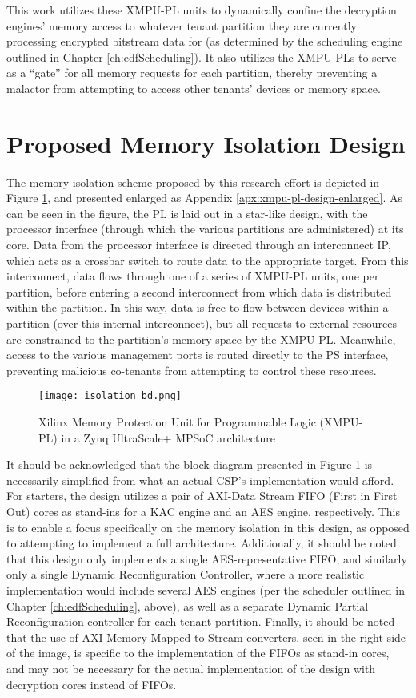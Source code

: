 This work utilizes these XMPU-PL units to dynamically confine the decryption engines' memory access to whatever tenant partition they are currently processing encrypted bitstream data for (as determined by the scheduling engine outlined in Chapter \ref{ch:edfScheduling}). It also utilizes the XMPU-PLs to serve as a ``gate'' for all memory requests for each partition, thereby preventing a malactor from attempting to access other tenants' devices or memory space.

\section{Proposed Memory Isolation Design}\label{sec:DMADesign}

The memory isolation scheme proposed by this research effort is depicted in Figure \ref{fig:XMPU-PLDesign}, and presented enlarged as Appendix \ref{apx:xmpu-pl-design-enlarged}. As can be seen in the figure, the PL is laid out in a star-like design, with the processor interface (through which the various partitions are administered) at its core. Data from the processor interface is directed through an interconnect IP, which acts as a crossbar switch to route data to the appropriate target. From this interconnect, data flows through one of a series of XMPU-PL units, one per partition, before entering a second interconnect from which data is distributed within the partition. In this way, data is free to flow between devices within a partition (over this internal interconnect), but all requests to external resources are constrained to the partition's memory space by the XMPU-PL. Meanwhile, access to the various management ports is routed directly to the PS interface, preventing malicious co-tenants from attempting to control these resources.
\begin{figure}[ht]
    \centering
    \texttt{[image: isolation\_bd.png]}
    \caption [Proposed XMPU-PL Design]{Xilinx Memory Protection Unit for Programmable Logic (XMPU-PL) in a Zynq UltraScale+ MPSoC architecture}
    \label{fig:XMPU-PLDesign}
\end{figure}

It should be acknowledged that the block diagram presented in Figure \ref{fig:XMPU-PLDesign} is necessarily simplified from what an actual CSP's implementation would afford. For starters, the design utilizes a pair of AXI-Data Stream FIFO (First in First Out) cores as stand-ins for a KAC engine and an AES engine, respectively. This is to enable a focus specifically on the memory isolation in this design, as opposed to attempting to implement a full architecture. Additionally, it should be noted that this design only implements a single AES-representative FIFO, and similarly only a single Dynamic Reconfiguration Controller, where a more realistic implementation would include several AES engines (per the scheduler outlined in Chapter \ref{ch:edfScheduling}, above), as well as a separate Dynamic Partial Reconfiguration controller for each tenant partition. Finally, it should be noted that the use of AXI-Memory Mapped to Stream converters, seen in the right side of the image, is specific to the implementation of the FIFOs as stand-in cores, and may not be necessary for the actual implementation of the design with decryption cores instead of FIFOs.
